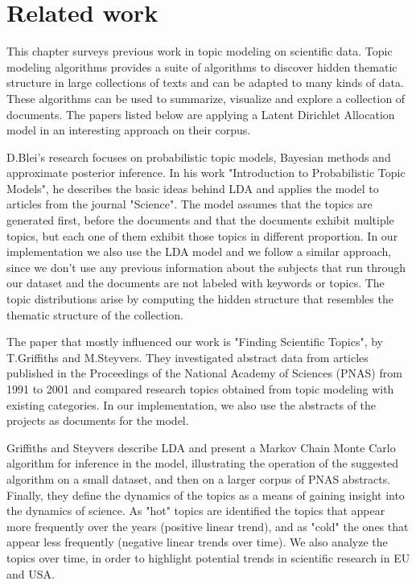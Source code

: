\documentclass[12pt]{report}
\begin{document}
\section{Related work}

This chapter surveys previous work in topic modeling on scientific data. Topic
modeling algorithms provides a suite of algorithms to discover hidden thematic
structure in large collections of texts and can be adapted to many kinds of
data. These algorithms can be used to summarize, visualize and explore a
collection of documents. The papers listed below are applying a Latent Dirichlet
Allocation model in an interesting approach on their corpus.

D.Blei's research focuses on probabilistic topic models, Bayesian methods and
approximate posterior inference. In his work "Introduction to Probabilistic
Topic Models",\cite{Blei11introductionto} he describes the basic ideas behind
LDA and applies the model to articles from the journal "Science". The model
assumes that the topics are generated first, before the documents and that the
documents exhibit multiple topics, but each one of them exhibit those topics in
different proportion. In our implementation we also use the LDA model and we
follow a similar approach, since we don't use any previous information about the
subjects that run through our dataset and the documents are not labeled with
keywords or topics. The topic distributions arise by computing the hidden
structure that resembles the thematic structure of the collection.

The paper that mostly influenced our work is "Finding Scientific Topics", by
T.Griffiths and M.Steyvers.\cite{griffiths_steyvers04} They investigated
abstract data from articles published in the Proceedings of the National Academy
of Sciences (PNAS) from 1991 to 2001 and compared research topics obtained from
topic modeling with existing categories. In our implementation, we also use 
the abstracts of the projects as documents for the model.

Griffiths and Steyvers describe LDA and present a Markov Chain Monte Carlo
algorithm for inference in the model, illustrating the operation of the
suggested algorithm on a small dataset, and then on a larger corpus of PNAS
abstracts. Finally, they define the dynamics of the topics as a means of gaining
insight into the dynamics of science. As "hot" topics are identified the topics
that appear more frequently over the years (positive linear trend), and as
"cold" the ones that appear less frequently (negative linear trends over time).
We also analyze the topics over time, in order to highlight potential trends in
scientific research in EU and USA.
\end{document}
